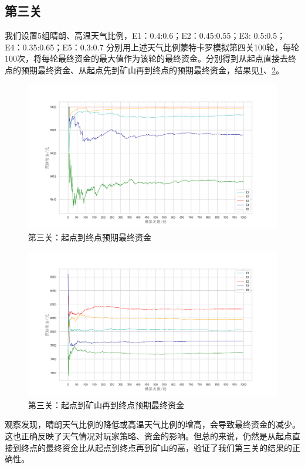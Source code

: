 \documentclass[withoutpreface,bwprint]{cumcmthesis} %
\begin{document}
\subsection{第三关}
我们设置5组晴朗、高温天气比例，E1：0.4:0.6；E2：0.45:0.55；E3: 0.5:0.5；E4：0.35:0.65；E5：0.3:0.7
分别用上述天气比例蒙特卡罗模拟第四关100轮，每轮100次，将每轮最终资金的最大值作为该轮的最终资金。分别得到从起点直接去终点的预期最终资金、从起点先到矿山再到终点的预期最终资金，结果见\cref{fig:analysis3map1}、\cref{fig:analysis3map2}。
\begin{figure}[H]
    \centering
    \includegraphics[width=1\textwidth]{figures/analysis3map1.png}
    \caption{第三关：起点到终点预期最终资金}
    \label{fig:analysis3map1}
\end{figure}


\begin{figure}[H]
    \centering
    \includegraphics[width=1\textwidth]{figures/analysis3map2.png}
    \caption{第三关：起点到矿山再到终点预期最终资金}
    \label{fig:analysis3map2}
\end{figure}
观察发现，晴朗天气比例的降低或高温天气比例的增高，会导致最终资金的减少。这也正确反映了天气情况对玩家策略、资金的影响。但总的来说，仍然是从起点直接到终点的最终资金比从起点到终点再到矿山的高，验证了我们第三关的结果的正确性。
\end{document}

